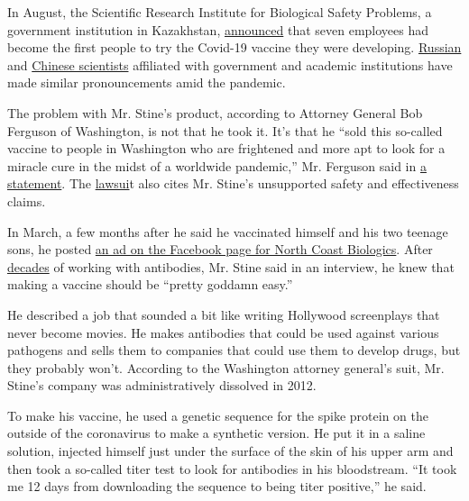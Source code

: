 In August, the Scientific Research Institute for Biological Safety
Problems, a government institution in Kazakhstan,
\href{https://www.biosafety.kz/en/uncategorized/\%D1\%83\%D1\%87\%D0\%B5\%D0\%BD\%D1\%8B\%D0\%B5-\%D0\%BD\%D0\%B8\%D0\%B8-\%D0\%BF\%D1\%80\%D0\%BE\%D0\%B1\%D0\%BB\%D0\%B5\%D0\%BC-\%D0\%B1\%D0\%B8\%D0\%BE\%D0\%BB\%D0\%BE\%D0\%B3\%D0\%B8\%D1\%87\%D0\%B5\%D1\%81\%D0\%BA\%D0\%BE\%D0\%B9-\%D0\%B1\%D0\%B5\%D0\%B7/}{announced}
that seven employees had become the first people to try the Covid-19
vaccine they were developing.
\href{https://www.washingtonpost.com/world/europe/russia-coronavirus-vaccine-race-ethics/2020/06/04/ce8b9464-a598-11ea-b619-3f9133bbb482_story.html}{Russian}
and
\href{https://www.the-scientist.com/news-opinion/self-experimentation-in-the-time-of-covid-19-67805}{Chinese
scientists} affiliated with government and academic institutions have
made similar pronouncements amid the pandemic.

The problem with Mr. Stine's product, according to Attorney General Bob
Ferguson of Washington, is not that he took it. It's that he ``sold this
so-called vaccine to people in Washington who are frightened and more
apt to look for a miracle cure in the midst of a worldwide pandemic,''
Mr. Ferguson said in
\href{https://www.atg.wa.gov/news/news-releases/ag-ferguson-files-lawsuit-against-seattle-business-marketed-and-sold-covid-19}{a
statement}. The
\href{https://agportal-s3bucket.s3.amazonaws.com/2020_06_12Complaint.pdf}{lawsui}t
also cites Mr. Stine's unsupported safety and effectiveness claims.

In March, a few months after he said he vaccinated himself and his two
teenage sons, he posted
\href{https://agportal-s3bucket.s3.amazonaws.com/uploadedfiles/Another/News/Press_Releases/StineSMPosts.pdf}{an
ad on the Facebook page for North Coast Biologics}. After
\href{https://www.businesswire.com/news/home/20050124005220/en/Spaltudaq-Corporation-Biotech-Company-Started-Accelerator-Newest}{decades}
of working with antibodies, Mr. Stine said in an interview, he knew that
making a vaccine should be ``pretty goddamn easy.''

He described a job that sounded a bit like writing Hollywood screenplays
that never become movies. He makes antibodies that could be used against
various pathogens and sells them to companies that could use them to
develop drugs, but they probably won't. According to the Washington
attorney general's suit, Mr. Stine's company was administratively
dissolved in 2012.

To make his vaccine, he used a genetic sequence for the spike protein on
the outside of the coronavirus to make a synthetic version. He put it in
a saline solution, injected himself just under the surface of the skin
of his upper arm and then took a so-called titer test to look for
antibodies in his bloodstream. ``It took me 12 days from downloading the
sequence to being titer positive,'' he said.

